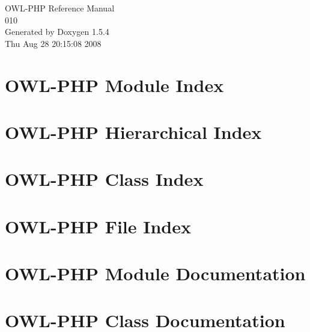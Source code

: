 \documentclass[a4paper]{book}
\begin{document}
\begin{titlepage}
\vspace*{7cm}
\begin{center}
{\Large OWL-PHP Reference Manual\\[1ex]\large 010 }\\
\vspace*{1cm}
{\large Generated by Doxygen 1.5.4}\\
\vspace*{0.5cm}
{\small Thu Aug 28 20:15:08 2008}\\
\end{center}
\end{titlepage}
\clearemptydoublepage
{}
\tableofcontents
\clearemptydoublepage
{}
\chapter{OWL-PHP Module Index}

\chapter{OWL-PHP Hierarchical Index}

\chapter{OWL-PHP Class Index}

\chapter{OWL-PHP File Index}

\chapter{OWL-PHP Module Documentation}




\chapter{OWL-PHP Class Documentation}
















\end{document}
